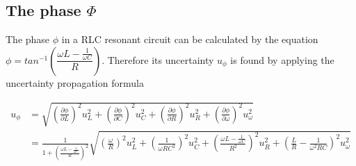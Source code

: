 \documentclass[12pt, a4paper]{article}
\begin{document}
\subsection{The phase $\Phi$}
The phase $\phi$ in a RLC resonant circuit can be calculated by the equation $\phi=tan^{-1}\left(\dfrac{\omega L-\frac{1}{\omega C}}{R}\right)$. Therefore its uncertainty $u_{\phi}$ is found by applying the uncertainty propagation formula

\begin{align*}
	u_{\phi}&=\sqrt{\left(\frac{\partial \phi}{\partial L}\right)^2u_L^2+\left(\frac{\partial \phi}{\partial C}\right)^2u_C^2+\left(\frac{\partial \phi}{\partial R}\right)^2u_R^2+\left(\frac{\partial \phi}{\partial \omega}\right)^2u_\omega^2}\\
	&=\frac{1}{1+\left(\frac{\omega L-\frac{1}{\omega C}}{R}\right)^2}\sqrt{\left(\frac{\omega}{R}\right)^2u_L^2+\left(\frac{1}{\omega RC^2}\right)^2u_C^2+\left(\frac{\omega L-\frac{1}{\omega C}}{R^2}\right)^2u_R^2+\left(\frac{L}{R}-\frac{1}{\omega^2RC}\right)^2u_\omega^2}
\end{align*}
\end{document}
